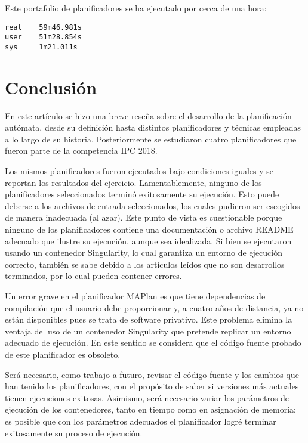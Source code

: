 \documentclass[a4paper,12pt,twocolumn]{article}
\begin{document}
Este portafolio de planificadores se ha ejecutado por cerca de una hora:

\begin{lstlisting}[style=consola]
real    59m46.981s
user    51m28.854s
sys     1m21.011s  
\end{lstlisting}

\section{Conclusión}

En este artículo se hizo una breve reseña sobre el desarrollo de la planificación autómata, desde su definición hasta distintos planificadores y técnicas empleadas a lo largo de su historia. Posteriormente se estudiaron cuatro planificadores que fueron parte de la competencia IPC 2018.

Los mismos planificadores fueron ejecutados bajo condiciones iguales y se reportan los resultados del ejercicio. Lamentablemente, ninguno de los planificadores seleccionados terminó exitosamente su ejecución. Esto puede deberse a los archivos de entrada seleccionados, los cuales pudieron ser escogidos de manera inadecuada (al azar). Este punto de vista es cuestionable porque ninguno de los planificadores contiene una documentación o archivo README adecuado que ilustre su ejecución, aunque sea idealizada. Si bien se ejecutaron usando un contenedor Singularity, lo cual garantiza un entorno de ejecución correcto, también se sabe debido a los artículos leídos que no son desarrollos terminados, por lo cual pueden contener errores.

Un error grave en el planificador MAPlan es que tiene dependencias de compilación que el usuario debe proporcionar y, a cuatro años de distancia, ya no están disponibles pues se trata de software privativo. Este problema elimina la ventaja del uso de un contenedor Singularity que pretende replicar un entorno adecuado de ejecución. En este sentido se considera que el código fuente probado de este planificador es obsoleto.

Será necesario, como trabajo a futuro, revisar el código fuente y los cambios que han tenido los planificadores, con el propósito de saber si versiones más actuales tienen ejecuciones exitosas. Asimismo, será necesario variar los parámetros de ejecución de los contenedores, tanto en tiempo como en asignación de memoria; es posible que con los parámetros adecuados el planificador logré terminar exitosamente su proceso de ejecución.



\end{document}
